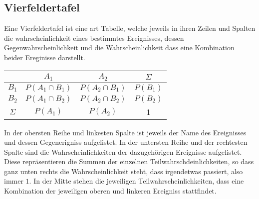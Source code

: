 \documentclass{article}
\begin{document}
\subsection{Vierfeldertafel}
\begin{minipage}{\dimexpr\linewidth-8cm} 
 Eine Vierfeldertafel ist eine art Tabelle, welche jeweils in ihren Zeilen und Spalten die wahrscheinlichkeit eines bestimmtes Ereignisses, dessen Gegenwahrscheinlichkeit und die Wahrscheinlichkeit dass eine Kombination beider Ereginisse darstellt.
 
\end{minipage}
\hfill
\begin{minipage}{8cm}
 \center
 \begin{tabular}{ |c|c|c|c| }
  \hline
        & $A_1$ & $A_2$ & $\Sigma$ \\
  \hline
  $B_1$ & $P(A_1 \cap B_1)$ & $P(A_2 \cap B_1)$ & $P(B_1)$ \\
  \hline
  $B_2$ & $P(A_1 \cap B_2)$ & $P(A_2 \cap B_2)$ & $P(B_2)$ \\
  \hline
  $\Sigma$ & $P(A_1)$ & $P(A_2)$ & 1 \\
  \hline
 \end{tabular}
\end{minipage}
In der obersten Reihe und linkesten Spalte ist jeweils der Name des Ereignisses und dessen Gegenerigniss aufgelistet. In der untersten Reihe und der rechtesten Spalte sind die Wahrscheinlichkeiten der dazugehörigen Ereignisse aufgelistet. Diese repräsentieren die Summen der einzelnen Teilwahrschdeinlichkeiten, so dass ganz unten rechts die Wahrscheinlichkeit steht, dass irgendetwas passiert, also immer $1$. \newline
In der Mitte stehen die jeweiligen Teilwahrscheinlichkeiten, dass eine Kombination der jeweiligen oberen und linkeren Ereigniss stattfindet. 
\end{document}
